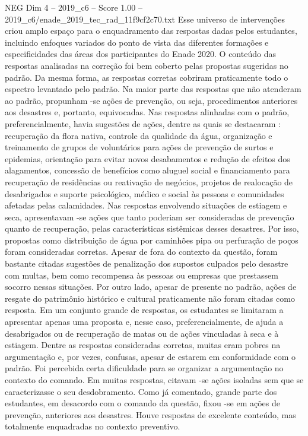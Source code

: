 \begin{textsample}{NEG Dim 4 – 2019\_c6 – Score 1.00 – 2019\_c6/enade\_2019\_tec\_rad\_11f9cf2c70.txt}
Esse universo de intervenções criou amplo espaço para o enquadramento das respostas dadas pelos estudantes, incluindo enfoques variados do ponto de vista das diferentes formações e especificidades das áreas dos participantes do Enade 2020.
O conteúdo das respostas analisadas na correção foi bem coberto pelas propostas sugeridas no padrão.
Da mesma forma, as respostas corretas cobriram praticamente todo o espectro levantado pelo padrão.
Na maior parte das respostas que não atenderam ao padrão, propunham -se ações de prevenção, ou seja, procedimentos anteriores aos desastres e, portanto, equivocadas.
Nas respostas alinhadas com o padrão, preferencialmente, havia sugestões de ações, dentre as quais se destacaram : recuperação da flora nativa, controle da qualidade da água, organização e treinamento de grupos de voluntários para ações de prevenção de surtos e epidemias, orientação para evitar novos desabamentos e redução de efeitos dos alagamentos, concessão de benefícios como aluguel social e financiamento para recuperação de residências ou reativação de negócios, projetos de realocação de desabrigados e suporte psicológico, médico e social às pessoas e comunidades afetadas pelas calamidades.
Nas respostas envolvendo situações de estiagem e seca, apresentavam -se ações que tanto poderiam ser consideradas de prevenção quanto de recuperação, pelas características sistêmicas desses desastres.
Por isso, propostas como distribuição de água por caminhões pipa ou perfuração de poços foram consideradas corretas.
Apesar de fora do contexto da questão, foram bastante citadas sugestões de penalização dos supostos culpados pelo desastre com multas, bem como recompensa às pessoas ou empresas que prestassem socorro nessas situações.
Por outro lado, apesar de presente no padrão, ações de resgate do patrimônio histórico e cultural praticamente não foram citadas como resposta.
Em um conjunto grande de respostas, os estudantes se limitaram a apresentar apenas uma proposta e, nesse caso, preferencialmente, de ajuda a desabrigados ou de recuperação de matas ou de ações vinculadas à seca e à estiagem.
Dentre as respostas consideradas corretas, muitas eram pobres na argumentação e, por vezes, confusas, apesar de estarem em conformidade com o padrão.
Foi percebida certa dificuldade para se organizar a argumentação no contexto do comando.
Em muitas respostas, citavam -se ações isoladas sem que se caracterizasse o seu desdobramento.
Como já comentado, grande parte dos estudantes, em desacordo com o comando da questão, fixou -se em ações de prevenção, anteriores aos desastres.
Houve respostas de excelente conteúdo, mas totalmente enquadradas no contexto preventivo.

\end{textsample}
